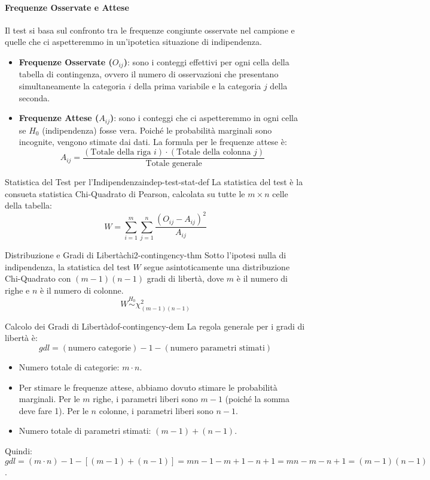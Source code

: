 \paragraph{Frequenze Osservate e Attese}
Il test si basa sul confronto tra le frequenze congiunte osservate nel campione
e quelle che ci aspetteremmo in un'ipotetica situazione di indipendenza.
\begin{itemize}
    \item \textbf{Frequenze Osservate (\(O_{ij}\))}: sono i conteggi effettivi
    per ogni cella della tabella di contingenza, ovvero il numero di
    osservazioni che presentano simultaneamente la categoria \(i\) della prima
    variabile e la categoria \(j\) della seconda.
    \item \textbf{Frequenze Attese (\(A_{ij}\))}: sono i conteggi che ci
    aspetteremmo in ogni cella se \(H_0\) (indipendenza) fosse vera. Poiché le
    probabilità marginali sono incognite, vengono stimate dai dati. La formula
    per le frequenze attese è:
    \[ A_{ij} = \frac{(\text{Totale della riga } i) \cdot (\text{Totale della
    colonna } j)}{\text{Totale generale}} \]
\end{itemize}

\begin{definizione}{Statistica del Test per l'Indipendenza}{indep-test-stat-def}
La statistica del test è la consueta statistica Chi-Quadrato di Pearson,
calcolata su tutte le \(m \times n\) celle della tabella:
\[ W = \sum_{i=1}^{m} \sum_{j=1}^{n} \frac{(O_{ij} - A_{ij})^2}{A_{ij}} \]
\end{definizione}

\begin{teorema}{Distribuzione e Gradi di Libertà}{chi2-contingency-thm}
Sotto l'ipotesi nulla di indipendenza, la statistica del test \(W\) segue
asintoticamente una distribuzione Chi-Quadrato con \((m-1)(n-1)\) gradi di
libertà, dove \(m\) è il numero di righe e \(n\) è il numero di colonne.
\[ W \stackrel{H_0}{\sim} \chi^2_{(m-1)(n-1)} \]
\end{teorema}

\begin{dimostrazione}{Calcolo dei Gradi di Libertà}{dof-contingency-dem}
La regola generale per i gradi di libertà è:
\[
gdl = (\text{numero categorie}) - 1 - (\text{numero parametri stimati})
\]
\begin{itemize}
    \item Numero totale di categorie: \(m \cdot n\).
    \item Per stimare le frequenze attese, abbiamo dovuto stimare le
    probabilità marginali. Per le \(m\) righe, i parametri liberi sono \(m-1\)
    (poiché la somma deve fare 1). Per le \(n\) colonne, i parametri liberi
    sono \(n-1\).
    \item Numero totale di parametri stimati: \((m-1) + (n-1)\).
\end{itemize}
Quindi: \( gdl = (m \cdot n) - 1 - [(m-1) + (n-1)] = mn - 1 - m + 1 - n + 1 = mn
- m - n + 1 = (m-1)(n-1) \).
\end{dimostrazione}

